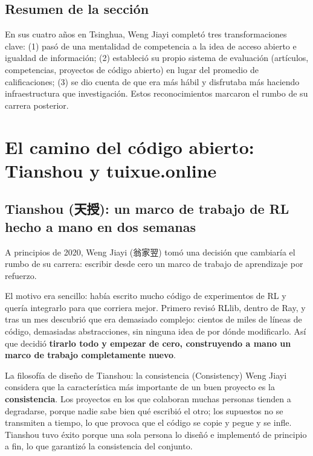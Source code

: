 \documentclass[a4paper]{article}
\begin{document}
\subsection{Resumen de la sección}

En sus cuatro años en Tsinghua, Weng Jiayi completó tres transformaciones clave: (1) pasó de una mentalidad de competencia a la idea de acceso abierto e igualdad de información; (2) estableció su propio sistema de evaluación (artículos, competencias, proyectos de código abierto) en lugar del promedio de calificaciones; (3) se dio cuenta de que era más hábil y disfrutaba más haciendo infraestructura que investigación. Estos reconocimientos marcaron el rumbo de su carrera posterior.
\section{El camino del código abierto: Tianshou y tuixue.online}

\subsection{Tianshou (天授): un marco de trabajo de RL hecho a mano en dos semanas}

A principios de 2020, Weng Jiayi (翁家翌) tomó una decisión que cambiaría el rumbo de su carrera: escribir desde cero un marco de trabajo de aprendizaje por refuerzo.

El motivo era sencillo: había escrito mucho código de experimentos de RL y quería integrarlo para que corriera mejor. Primero revisó RLlib, dentro de Ray, y tras un mes descubrió que era demasiado complejo: cientos de miles de líneas de código, demasiadas abstracciones, sin ninguna idea de por dónde modificarlo. Así que decidió \textbf{tirarlo todo y empezar de cero, construyendo a mano un marco de trabajo completamente nuevo}.

\begin{importantbox}{La filosofía de diseño de Tianshou: la consistencia (Consistency)}
Weng Jiayi considera que la característica más importante de un buen proyecto es la \textbf{consistencia}. Los proyectos en los que colaboran muchas personas tienden a degradarse, porque nadie sabe bien qué escribió el otro; los supuestos no se transmiten a tiempo, lo que provoca que el código se copie y pegue y se infle. Tianshou tuvo éxito porque una sola persona lo diseñó e implementó de principio a fin, lo que garantizó la consistencia del conjunto.
\end{importantbox}
\end{document}
